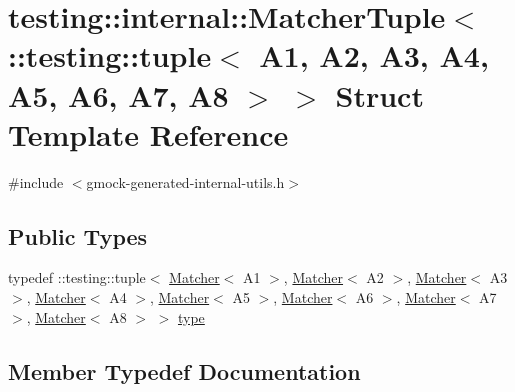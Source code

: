 \hypertarget{structtesting_1_1internal_1_1MatcherTuple_3_01_1_1testing_1_1tuple_3_01A1_00_01A2_00_01A3_00_01Aed2bba98e2ef5f11a8df3506707ec6d8}{}\section{testing\+::internal\+::Matcher\+Tuple$<$ \+::testing\+::tuple$<$ A1, A2, A3, A4, A5, A6, A7, A8 $>$ $>$ Struct Template Reference}
\label{structtesting_1_1internal_1_1MatcherTuple_3_01_1_1testing_1_1tuple_3_01A1_00_01A2_00_01A3_00_01Aed2bba98e2ef5f11a8df3506707ec6d8}


{\ttfamily \#include $<$gmock-\/generated-\/internal-\/utils.\+h$>$}

\subsection*{Public Types}
\begin{DoxyCompactItemize}
\item 
typedef \+::testing\+::tuple$<$ \mbox{\hyperlink{classtesting_1_1Matcher}{Matcher}}$<$ A1 $>$, \mbox{\hyperlink{classtesting_1_1Matcher}{Matcher}}$<$ A2 $>$, \mbox{\hyperlink{classtesting_1_1Matcher}{Matcher}}$<$ A3 $>$, \mbox{\hyperlink{classtesting_1_1Matcher}{Matcher}}$<$ A4 $>$, \mbox{\hyperlink{classtesting_1_1Matcher}{Matcher}}$<$ A5 $>$, \mbox{\hyperlink{classtesting_1_1Matcher}{Matcher}}$<$ A6 $>$, \mbox{\hyperlink{classtesting_1_1Matcher}{Matcher}}$<$ A7 $>$, \mbox{\hyperlink{classtesting_1_1Matcher}{Matcher}}$<$ A8 $>$ $>$ \mbox{\hyperlink{structtesting_1_1internal_1_1MatcherTuple_3_01_1_1testing_1_1tuple_3_01A1_00_01A2_00_01A3_00_01Aed2bba98e2ef5f11a8df3506707ec6d8_a17186b5ae808ec16b84eb4022ab7a089}{type}}
\end{DoxyCompactItemize}


\subsection{Member Typedef Documentation}
\mbox{\label{structtesting_1_1internal_1_1MatcherTuple_3_01_1_1testing_1_1tuple_3_01A1_00_01A2_00_01A3_00_01Aed2bba98e2ef5f11a8df3506707ec6d8_a17186b5ae808ec16b84eb4022ab7a089}} 
